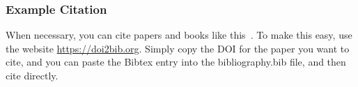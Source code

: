 \begin{frame}
    \frametitle{Example Citation}
    When necessary, you can cite papers and books like this~\cite{Kasemer2017}.
    To make this easy, use the website \url{https://doi2bib.org}. Simply copy the DOI for the paper you want to cite, and you can paste the Bibtex entry into the bibliography.bib file, and then cite directly.
\end{frame}